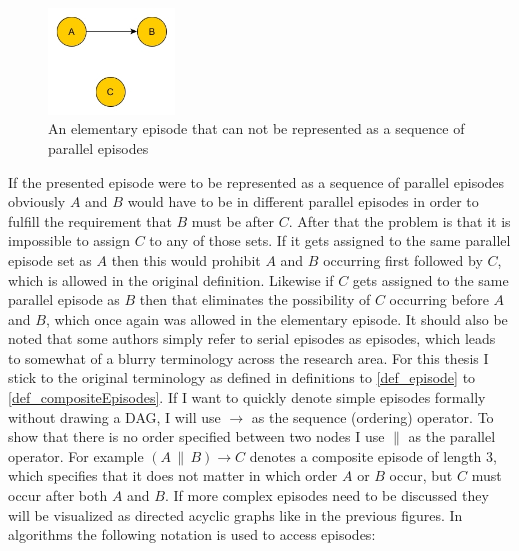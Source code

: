 \begin{figure}[h]
	\centering
  	\includegraphics[width=0.3\textwidth]{notSequenceOfSet}
	\caption[An Elementary Episode]{An elementary episode that can not be represented as a sequence of parallel episodes}
	\label{fig_notSequenceOfSet}
\end{figure}

If the presented episode were to be represented as a sequence of parallel episodes obviously $A$ and $B$ would have to be in different parallel episodes in order to fulfill the requirement that $B$ must be after $C$. After that the problem is that it is impossible to assign $C$ to any of those sets. If it gets assigned to the same parallel episode set as $A$ then this would prohibit $A$ and $B$ occurring first followed by $C$, which is allowed in the original definition. Likewise if $C$ gets assigned to the same parallel episode as $B$ then that eliminates the possibility of $C$ occurring before $A$ and $B$, which once again was allowed in the elementary episode. It should also be noted that some authors simply refer to serial episodes as episodes, which leads to somewhat of a blurry terminology across the research area. For this thesis I stick to the original terminology as defined in definitions to \ref{def_episode} to \ref{def_compositeEpisodes}. \newline
If I want to quickly denote simple episodes formally without drawing a DAG, I will use $\rightarrow$ as the sequence (ordering) operator. To show that there is no order specified between two nodes I use $\|$ as the parallel operator. For example $(A \, \| \, B ) \rightarrow C$ denotes a composite episode of length 3, which specifies that it does not matter in which order $A$ or $B$ occur, but $C$ must occur after both $A$ and $B$. If more complex episodes need to be discussed they will be visualized as directed acyclic graphs like in the previous figures. \newline 
In algorithms the following notation is used to access episodes:

